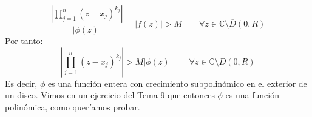 \documentclass[12pt]{article}
\begin{document}
\begin{ejercicio}[2.5 puntos]
\begin{enumerate}[label=\alph*)]
                \begin{equation*}
                    \dfrac{\left|\prod\limits_{j=1}^{n}{(z-x_j)}^{k_j}\right|}{|\phi(z)|}  = |f(z)| > M \qquad \forall z\in \mathbb{C}\setminus \overline{D}(0,R)
                \end{equation*}
                Por tanto:
                \begin{equation*}
                    \left|\prod\limits_{j=1}^{n}{(z-x_j)}^{k_j}\right| > M|\phi(z)| \qquad \forall z\in \mathbb{C}\setminus\overline{D}(0,R)
                \end{equation*}
                Es decir, $\phi$ es una función entera con crecimiento subpolinómico en el exterior de un disco. Vimos en un ejercicio del Tema 9 que entonces $\phi$ es una función polinómica, como queríamos probar.
        \end{enumerate}
    \end{ejercicio}
\end{document}
